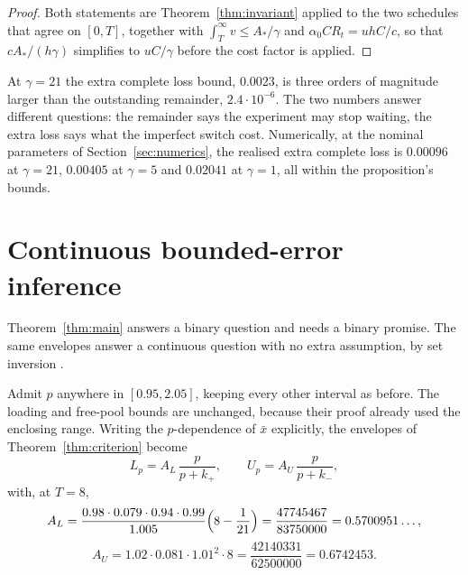 \documentclass[11pt]{article}
\theoremstyle{definition}
\theoremstyle{remark}
\newcommand{\xb}{\bar{x}}
\begin{document}
\begin{proof}
Both statements are Theorem~\ref{thm:invariant} applied to the two schedules
that agree on $[0,T]$, together with $\int_T^\infty v\le A_*/\gamma$ and
$\alpha_0CR_t=uhC/c$, so that $cA_*/(h\gamma)$ simplifies to $uC/\gamma$ before
the cost factor is applied.
\end{proof}

At $\gamma=21$ the extra complete loss bound, $0.0023$, is three orders of
magnitude larger than the outstanding remainder, $2.4\cdot10^{-6}$. The two
numbers answer different questions: the remainder says the experiment may stop
waiting, the extra loss says what the imperfect switch cost. Numerically, at the
nominal parameters of Section~\ref{sec:numerics}, the realised extra complete
loss is $0.00096$ at $\gamma=21$, $0.00405$ at $\gamma=5$ and $0.02041$ at
$\gamma=1$, all within the proposition's bounds.

\section{Continuous bounded-error inference}
\label{sec:outer}

Theorem~\ref{thm:main} answers a binary question and needs a binary promise. The
same envelopes answer a continuous question with no extra assumption, by set
inversion \citep{jaulin1993}.

Admit $p$ anywhere in $[0.95,2.05]$, keeping every other interval as before. The
loading and free-pool bounds are unchanged, because their proof already used the
enclosing range. Writing the $p$-dependence of $\xb$ explicitly, the envelopes of
Theorem~\ref{thm:criterion} become
\begin{equation}
L_p=A_L\,\frac{p}{p+k_+},\qquad
U_p=A_U\,\frac{p}{p+k_-},
\label{eq:envelopes-p}
\end{equation}
with, at $T=8$,
\[
A_L=\frac{0.98\cdot0.079\cdot0.94\cdot0.99}{1.005}\Bigl(8-\frac1{21}\Bigr)
=\frac{47745467}{83750000}=0.5700951\ldots,
\]
\[
A_U=1.02\cdot0.081\cdot1.01^2\cdot8=\frac{42140331}{62500000}=0.6742453 .
\]
\end{document}
